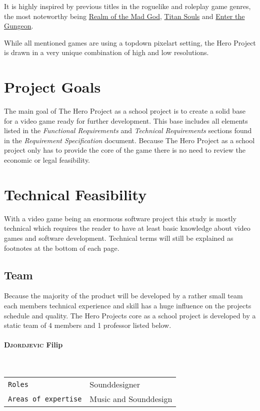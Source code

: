 \documentclass[11pt]{article}
\begin{document}
It is highly inspired by previous titles in the roguelike and roleplay game genres, the most noteworthy being \href{https://realmofthemadgod.com}{Realm of the Mad God}, \href{http://www.devolverdigital.com/games/view/titan-souls}{Titan Souls} and \href{http://dodgeroll.com/gungeon/}{Enter the Gungeon}.

While all mentioned games are using a topdown pixelart setting, the Hero Project is drawn in a very unique combination of high and low resolutions.

\section{Project Goals}
The main goal of The Hero Project as a school project is to create a solid base for a video game ready for further development.
This base includes all elements listed in the \textit{Functional Requirements} and \textit{Technical Requirements} sections found in the \textit{Requirement Specification} document.
Because The Hero Project as a school project only has to provide the core of the game there is no need to review the economic or legal feasibility.

\newpage

\section{Technical Feasibility}
With a video game being an enormous software project this study is mostly technical which requires the reader to have at least basic knowledge about video games and software development.
Technical terms will still be explained as footnotes at the bottom of each page.

\subsection{Team}
Because the majority of the product will be developed by a rather small team each members technical experience and skill has a huge influence on the projects schedule and quality.
The Hero Projects core as a school project is developed by a static team of 4 members and 1 professor listed below.
\paragraph{\textsc{Djordjevic} Filip} ~\\
\begin{tabular}{ll}
\texttt{Roles} & Sounddesigner\\
\texttt{Areas of expertise} & Music and Sounddesign
\end{tabular}
\end{document}
